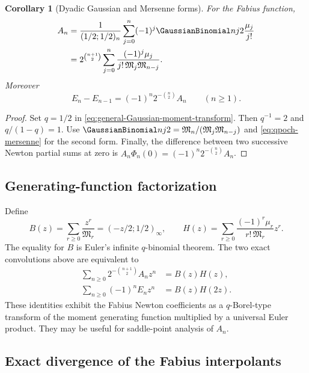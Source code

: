 \documentclass[11pt,a4paper,oneside]{article}
\newtheorem{corollary}[corollary]{Corollary}
\theoremstyle{definition}
\theoremstyle{remark}
\begin{document}
\begin{corollary}[Dyadic Gaussian and Mersenne forms]
\label{cor:dyadic-moment-transform}
For the Fabius function,
\begin{align}
 A_n
 &=\frac1{(1/2;1/2)_n}
 \sum_{j=0}^n(-1)^j\GaussianBinomial nj2\frac{\mu_j}{j!}
 \label{eq:fabius-Gaussian-transform}\\
 &=2^{\binom{n+1}{2}}
 \sum_{j=0}^n
 \frac{(-1)^j\mu_j}
 {j!\,\mathfrak M_j\mathfrak M_{n-j}}.
 \label{eq:fabius-Mersenne-transform}
\end{align}
Moreover
\begin{equation}
 E_n-E_{n-1}=(-1)^n2^{-\binom n2}A_n
 \qquad(n\ge1).
 \label{eq:endpoint-increment}
\end{equation}
\end{corollary}

\begin{proof}
Set $q=1/2$ in \eqref{eq:general-Gaussian-moment-transform}.  Then
$q^{-1}=2$ and $q/(1-q)=1$.  Use
\(
 \GaussianBinomial nj2=\mathfrak M_n/(\mathfrak M_j\mathfrak M_{n-j})
\)
and \eqref{eq:qpoch-mersenne} for the second form.  Finally, the difference
between two successive Newton partial sums at zero is
$A_n\Phi_n(0)=(-1)^n2^{-\binom n2}A_n$.
\end{proof}

\subsection{Generating-function factorization}

Define
\begin{equation}
 B(z)=\sum_{r\ge0}\frac{z^r}{\mathfrak M_r}
 =(-z/2;1/2)_\infty,
 \qquad
 H(z)=\sum_{r\ge0}\frac{(-1)^r\mu_r}{r!\,\mathfrak M_r}z^r.
 \label{eq:BH-generating}
\end{equation}
The equality for $B$ is Euler's infinite $q$-binomial theorem.  The two exact
convolutions above are equivalent to
\begin{align}
 \sum_{n\ge0}2^{-\binom{n+1}{2}}A_nz^n
 &=B(z)H(z),
 \label{eq:newton-generating-factorization}\\
 \sum_{n\ge0}(-1)^nE_nz^n
 &=B(z)H(2z).
 \label{eq:endpoint-generating-factorization}
\end{align}
These identities exhibit the Fabius Newton coefficients as a $q$-Borel-type
transform of the moment generating function multiplied by a universal Euler
product.  They may be useful for saddle-point analysis of $A_n$.

\subsection{Exact divergence of the Fabius interpolants}
\end{document}

